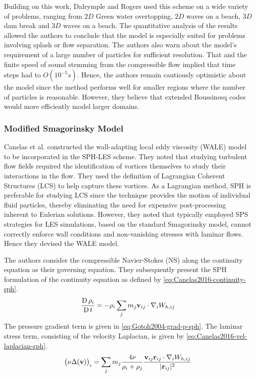 Building on this work, Dalrymple and Rogers \parencite{Dalrymple2006} used this scheme on a wide variety of problems, ranging from $2D$ Green water overtopping, $2D$ waves on a beach, $3D$ dam break and $3D$ waves on a beach. The quantitative analysis of the results allowed the authors to conclude that the model is especially suited for problems involving splash or flow separation. The authors also warn about the model's requirement of a large number of particles for sufficient resolution. That and the finite speed of sound stemming from the compressible flow implied that time steps had to $O(10^{-5}s)$. Hence, the authors remain cautiously optimistic about the model since the method performs well for smaller regions where the number of particles is reasonable. However, they believe that extended Boussinesq codes would more efficiently model larger domains.

\subsubsection{Modified Smagorinsky Model}
Canelas et al. \parencite{Canelas2016} constructed the wall-adapting local eddy viscosity (WALE) model to be incorporated in the SPH-LES scheme. They noted that studying turbulent flow fields required the identification of vortices themselves to study their interactions in the flow. They used the definition of Lagrangian Coherent Structures (LCS) to help capture these vortices. As a Lagrangian method, SPH is preferable for studying LCS since the technique provides the motion of individual fluid particles, thereby eliminating the need for expensive post-processing inherent to Eulerian solutions. 
However, they noted that typically employed SPS strategies for LES simulations, based on the standard Smagorinsky model, cannot correctly enforce wall conditions and non-vanishing stresses with laminar flows. Hence they devised the WALE model.

The authors consider the compressible Navier-Stokes (NS) along the continuity equation as their governing equation. They subsequently present the SPH formulation of the continuity equation as defined by \ref{eq:Canelas2016-continuity-sph}.
\begin{equation}
	\frac{\operatorname{D} \rho_i}{\operatorname{D} t} = - \rho_i \sum_j m_j \mathbf{v}_{ij} \cdot \nabla_{i} W_{h, ij}
	\label{eq:Canelas2016-continuity-sph}
\end{equation}
The pressure gradient term is given in \ref{eq:Gotoh2004-grad-p-sph}. The laminar stress term, consisting of the velocity Laplacian, is given by \ref{eq:Canelas2016-vel-laplacian-sph}. 
\begin{equation}
	\big(\nu \Delta(\mathbf{v}) \big)_i = \sum_j m_j \frac{4 \nu}{\rho_i + \rho_j}\frac{\mathbf{v}_{ij} \mathbf{r}_{ij} \cdot \nabla_{i} W_{h, ij}}{|\mathbf{r}_{ij}|^{2}}
	\label{eq:Canelas2016-vel-laplacian-sph}
\end{equation}

